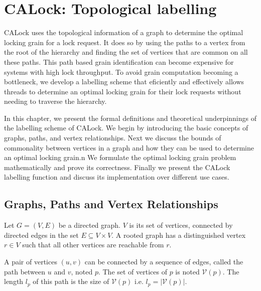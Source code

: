 

\chapter{CALock: Topological labelling} \label{chap:theory}
\minitoc
CALock uses the topological information of a graph to determine the optimal locking grain for a lock request. It does so by using the paths to a vertex from the root of the hierarchy and finding the set of vertices that are common on all these paths. This path based grain identification can become expensive for systems with high lock throughput. To avoid grain computation becoming a bottleneck, we develop a labelling scheme that eficiently and effectively allows threads to determine an optimal locking grain for their lock requests without needing to traverse the hierarchy.

In this chapter, we present the formal definitions and theoretical underpinnings of the labelling scheme of CALock.
We begin by introducing the basic concepts of graphs, paths, and vertex relationships.
Next we discuss the bounds of commonality between vertices in a graph and how they can be used to determine an optimal locking grain.n We formulate the optimal locking grain problem mathematically and prove its correctness. Finally we present the CALock labelling function and discuss its implementation over different use cases.

\section{Graphs, Paths and Vertex Relationships}


Let $G=(V, E)$ be a directed graph. $V$ is its set of vertices, connected by directed edges in the set $E \subseteq V \times V$.  A rooted graph has a distinguished vertex $r \in V$ such that all other vertices are reachable from $r$.

A pair of vertices $(u, v)$ can be connected by a sequence of edges, called the path between $u$ and $v$, noted $p$. The set of vertices of $p$ is noted $\mathcal{V}(p)$. The length $l_p$ of this path is the size of $\mathcal{V}(p)$ i.e. $l_p = \lvert \mathcal{V}(p)\rvert$.


